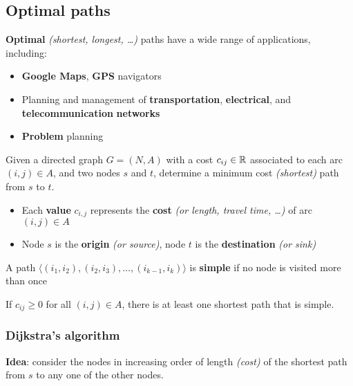 \documentclass[english]{article}
\begin{document}
\subsection{Optimal paths}

\textbf{Optimal} \textit{(shortest, longest, \ldots)} paths have a wide range of applications, including:

\begin{itemize}
  \item \textbf{Google Maps}, \textbf{GPS} navigators
  \item Planning and management of \textbf{transportation}, \textbf{electrical}, and \textbf{telecommunication} \textbf{networks}
  \item \textbf{Problem} planning
\end{itemize}

\bigskip
\begin{problem}
Given a directed graph \(G = (N, A)\) with a cost \(c_{ij} \in \mathbb{R}\) associated to each arc \((i, j) \in A\), and two nodes \(s\) and \(t\), determine a minimum cost \textit{(shortest)} path from \(s\) to \(t\).
\end{problem}

\begin{itemize}
  \item Each \textbf{value} \(c_{i, j}\) represents the \textbf{cost} \textit{(or length, travel time, \ldots)} of arc \((i, j) \in A\)
  \item Node \(s\) is the \textbf{origin} \textit{(or source)}, node \(t\) is the \textbf{destination} \textit{(or sink)}
\end{itemize}

\begin{property}
  A path \(\langle (i_1, i_2), (i_2, i_3), \ldots, (i_{k-1}, i_k)  \rangle\) is \textbf{simple} if no node is visited more than once
\end{property}

\begin{property}
  If \(c_{ij} \geq 0\) for all \((i, j) \in A\), there is at least one shortest path that is simple.
\end{property}

\subsubsection{Dijkstra's algorithm}

\textbf{Idea}: consider the nodes in increasing order of length \textit{(cost)} of the shortest path from \(s\) to any one of the other nodes.
\end{document}
